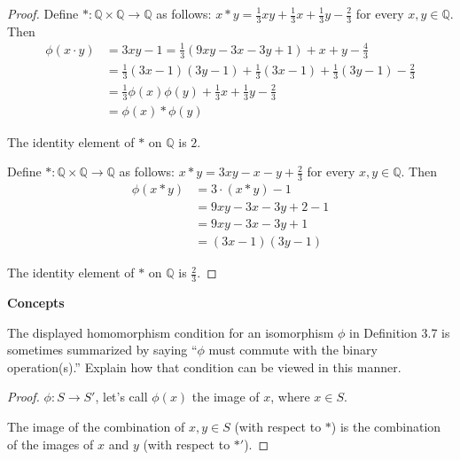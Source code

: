 \begin{proof}
    \item Define $*: \mathbb{Q}\times\mathbb{Q} \to \mathbb{Q}$ as follows: $x * y = \frac{1}{3}xy + \frac{1}{3}x + \frac{1}{3}y - \frac{2}{3}$ for every $x, y\in\mathbb{Q}$. Then
    \begin{align*}
        \phi(x\cdot y) & = 3xy - 1 = \frac{1}{3}(9xy - 3x - 3y + 1) + x + y - \frac{4}{3}                        \\
                       & = \frac{1}{3}(3x - 1)(3y - 1) + \frac{1}{3}(3x - 1) + \frac{1}{3}(3y - 1) - \frac{2}{3} \\
                       & = \frac{1}{3}\phi(x)\phi(y) + \frac{1}{3}x + \frac{1}{3}y - \frac{2}{3}                 \\
                       & = \phi(x) * \phi(y)
    \end{align*}

    The identity element of $*$ on $\mathbb{Q}$ is $2$.
    \item Define $*: \mathbb{Q}\times\mathbb{Q} \to \mathbb{Q}$ as follows: $x * y = 3xy - x - y + \frac{2}{3}$ for every $x, y\in\mathbb{Q}$. Then
    \begin{align*}
        \phi(x * y) & = 3\cdot (x * y) - 1    \\
                    & = 9xy - 3x - 3y + 2 - 1 \\
                    & = 9xy - 3x - 3y + 1     \\
                    & = (3x - 1)(3y - 1)
    \end{align*}

    The identity element of $*$ on $\mathbb{Q}$ is $\frac{2}{3}$.
\end{proof}

\textbf{Concepts}

\begin{exercise}
    The displayed homomorphism condition for an isomorphism $\phi$ in Definition 3.7 is sometimes summarized by saying ``$\phi$ must commute with the binary operation\@(s).\@'' Explain how that condition can be viewed in this manner.
\end{exercise}

\begin{proof}
    $\phi: S\to S'$, let's call $\phi(x)$ the image of $x$, where $x\in S$.

    The image of the combination of $x, y\in S$ (with respect to $*$) is the combination of the images of $x$ and $y$ (with respect to $*'$).
\end{proof}

